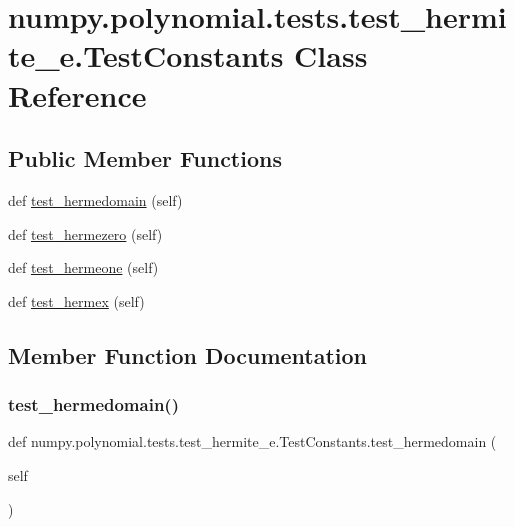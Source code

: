 \hypertarget{classnumpy_1_1polynomial_1_1tests_1_1test__hermite__e_1_1TestConstants}{}\section{numpy.\+polynomial.\+tests.\+test\+\_\+hermite\+\_\+e.\+Test\+Constants Class Reference}
\label{classnumpy_1_1polynomial_1_1tests_1_1test__hermite__e_1_1TestConstants}
\subsection*{Public Member Functions}
\begin{DoxyCompactItemize}
\item 
def \hyperlink{classnumpy_1_1polynomial_1_1tests_1_1test__hermite__e_1_1TestConstants_a715b5956a3fcc9184eb7ed00b9b4afe9}{test\+\_\+hermedomain} (self)
\item 
def \hyperlink{classnumpy_1_1polynomial_1_1tests_1_1test__hermite__e_1_1TestConstants_a5c87a26dad89e42d56fb7e59ce05aa77}{test\+\_\+hermezero} (self)
\item 
def \hyperlink{classnumpy_1_1polynomial_1_1tests_1_1test__hermite__e_1_1TestConstants_aea8f4662c0d594075d786e036f71dd48}{test\+\_\+hermeone} (self)
\item 
def \hyperlink{classnumpy_1_1polynomial_1_1tests_1_1test__hermite__e_1_1TestConstants_a07a03a855baf2e0d80b6d21c9cea4dbc}{test\+\_\+hermex} (self)
\end{DoxyCompactItemize}


\subsection{Member Function Documentation}
\mbox{\label{classnumpy_1_1polynomial_1_1tests_1_1test__hermite__e_1_1TestConstants_a715b5956a3fcc9184eb7ed00b9b4afe9}} 
\subsubsection{\texorpdfstring{test\+\_\+hermedomain()}{test\_hermedomain()}}
{\footnotesize\ttfamily def numpy.\+polynomial.\+tests.\+test\+\_\+hermite\+\_\+e.\+Test\+Constants.\+test\+\_\+hermedomain (\begin{DoxyParamCaption}\item[{}]{self }\end{DoxyParamCaption})}

